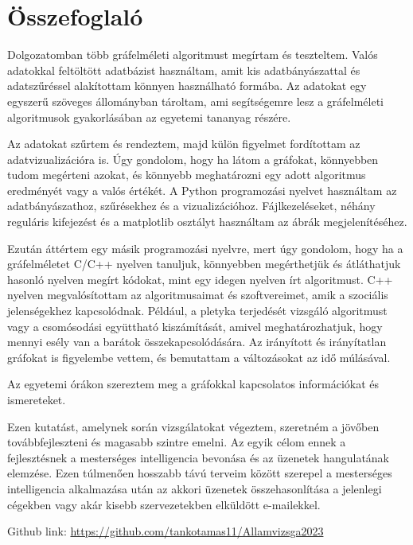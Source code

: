 \chapter*{Összefoglaló}

Dolgozatomban több gráfelméleti algoritmust megírtam és teszteltem. Valós adatokkal feltöltött adatbázist használtam, amit kis adatbányászattal és adatszűréssel alakítottam könnyen használható formába. Az adatokat egy egyszerű szöveges állományban tároltam, ami segítségemre lesz a gráfelméleti algoritmusok gyakorlásában az egyetemi tananyag részére.

Az adatokat szűrtem és rendeztem, majd külön figyelmet fordítottam az adatvizualizációra is. Úgy gondolom, hogy ha látom a gráfokat, könnyebben tudom megérteni azokat, és könnyebb meghatározni egy adott algoritmus eredményét vagy a valós értékét. A Python programozási nyelvet használtam az adatbányászathoz, szűrésekhez és a vizualizációhoz. Fájlkezeléseket, néhány reguláris kifejezést és a matplotlib osztályt használtam az ábrák megjelenítéséhez.

Ezután áttértem egy másik programozási nyelvre, mert úgy gondolom, hogy ha a gráfelméletet C/C++ nyelven tanuljuk, könnyebben megérthetjük és átláthatjuk hasonló nyelven megírt kódokat, mint egy idegen nyelven írt algoritmust. C++ nyelven megvalósítottam az algoritmusaimat és szoftvereimet, amik a szociális jelenségekhez kapcsolódnak. Például, a pletyka terjedését vizsgáló algoritmust vagy a csomósodási együttható kiszámítását, amivel meghatározhatjuk, hogy mennyi esély van a barátok összekapcsolódására. Az irányított és irányítatlan gráfokat is figyelembe vettem, és bemutattam a változásokat az idő múlásával.

Az egyetemi órákon szereztem meg a gráfokkal kapcsolatos információkat és ismereteket.\cite{Katai}

Ezen kutatást, amelynek során vizsgálatokat végeztem, szeretném a jövőben továbbfejleszteni és magasabb szintre emelni. Az egyik célom ennek a fejlesztésnek a mesterséges intelligencia bevonása és az üzenetek hangulatának elemzése. Ezen túlmenően hosszabb távú terveim között szerepel a mesterséges intelligencia alkalmazása után az akkori üzenetek összehasonlítása a jelenlegi cégekben vagy akár kisebb szervezetekben elküldött e-mailekkel.

Github link: \url{https://github.com/tankotamas11/Allamvizsga2023}